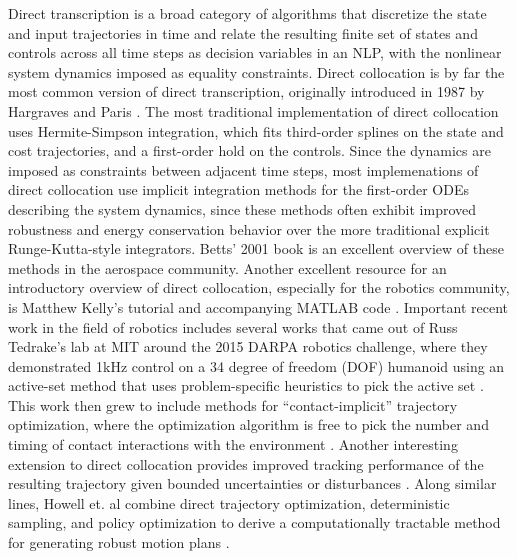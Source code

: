 \documentclass[../root.tex]{subfiles}
\begin{document}
Direct transcription is a broad category of algorithms that discretize the
state and input trajectories in time and relate the resulting finite set of
states and controls across all time steps as decision variables in an NLP,
with the nonlinear system dynamics imposed as equality constraints. Direct
collocation is by far the most common version of direct transcription,
originally introduced in 1987 by Hargraves and Paris
\cite{hargraves_Direct_1987}. The most traditional implementation of direct
collocation uses Hermite-Simpson integration, which fits third-order splines
on the state and cost trajectories, and a first-order hold on the controls.
Since the dynamics are imposed as constraints between adjacent time steps,
most implemenations of direct collocation use implicit integration methods
for the first-order ODEs describing the system dynamics, since these methods
often exhibit improved robustness and energy conservation behavior over the
more traditional explicit Runge-Kutta-style integrators. Betts' 2001 book
\cite{betts_Practical_2001} is an excellent overview of these methods in the
aerospace community. Another excellent resource for an introductory overview
of direct collocation, especially for the robotics community, is Matthew
Kelly's tutorial and accompanying MATLAB code \cite{kelly_Introduction_2017}.
Important recent work in the field of robotics includes several works that
came out of Russ Tedrake's lab at MIT around the 2015 DARPA robotics
challenge, where they demonstrated 1kHz control on a 34 degree of freedom
(DOF) humanoid using an active-set method that uses problem-specific
heuristics to pick the active set \cite{kuindersma_efficiently_2014}. This
work then grew to include methods for ``contact-implicit'' trajectory
optimization, where the optimization algorithm is free to pick the number and
timing of contact interactions with the environment
\cite{posa_direct_2014,posa_Optimization_2016,manchester_Variational_2017,
patel_ContactImplicit_2019}. Another interesting extension to direct
collocation provides improved tracking performance of the resulting
trajectory given bounded uncertainties or disturbances
\cite{manchester_DIRTREL_2017}. Along similar lines, Howell et. al combine
direct trajectory optimization, deterministic sampling, and policy
optimization to derive a computationally tractable method for generating
robust motion plans \cite{howell_Direct_2021}.
\end{document}
